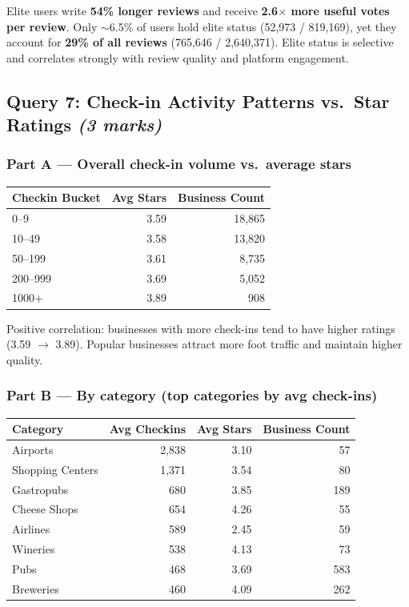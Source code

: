 \documentclass[12pt,a4paper]{article}
\newcommand{\marks}[1]{\hfill\textit{(#1 marks)}}
\begin{document}
Elite users write \textbf{54\% longer reviews} and receive \textbf{2.6$\times$
more useful votes per review}. Only $\sim$6.5\% of users hold elite status
(52,973 / 819,169), yet they account for \textbf{29\% of all reviews}
(765,646 / 2,640,371). Elite status is selective and correlates strongly with
review quality and platform engagement.

\subsection{Query 7: Check-in Activity Patterns vs.\ Star Ratings \marks{3}}

\subsubsection*{Part A --- Overall check-in volume vs.\ average stars}

\begin{table}[H]
  \centering
  \begin{tabular}{lrr}
    \toprule
    \textbf{Checkin Bucket} & \textbf{Avg Stars} & \textbf{Business Count} \\
    \midrule
    0--9    & 3.59 & 18,865 \\
    10--49  & 3.58 & 13,820 \\
    50--199 & 3.61 &  8,735 \\
    200--999 & 3.69 & 5,052 \\
    1000+   & 3.89 &    908 \\
    \bottomrule
  \end{tabular}
\end{table}

Positive correlation: businesses with more check-ins tend to have higher
ratings (3.59 $\to$ 3.89). Popular businesses attract more foot traffic and
maintain higher quality.

\subsubsection*{Part B --- By category (top categories by avg check-ins)}

\begin{table}[H]
  \centering
  \begin{tabular}{lrrr}
    \toprule
    \textbf{Category} & \textbf{Avg Checkins} & \textbf{Avg Stars} & \textbf{Business Count} \\
    \midrule
    Airports          & 2,838 & 3.10 &  57 \\
    Shopping Centers  & 1,371 & 3.54 &  80 \\
    Gastropubs        &   680 & 3.85 & 189 \\
    Cheese Shops      &   654 & 4.26 &  55 \\
    Airlines          &   589 & 2.45 &  59 \\
    Wineries          &   538 & 4.13 &  73 \\
    Pubs              &   468 & 3.69 & 583 \\
    Breweries         &   460 & 4.09 & 262 \\
    \bottomrule
  \end{tabular}
\end{table}
\end{document}
